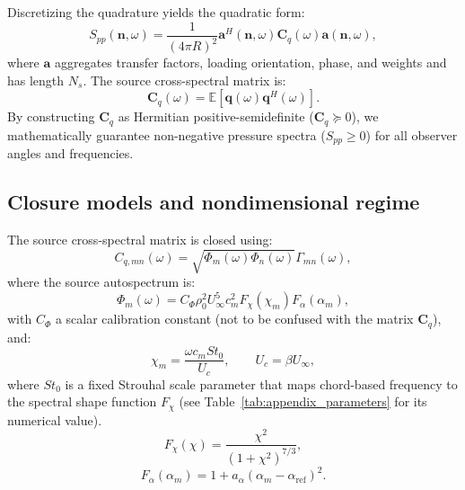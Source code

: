 \documentclass[11pt]{article}
\newcommand{\vect}[1]{\bm{#1}}
\newcommand{\mat}[1]{\bm{#1}}
\newcommand{\E}{\mathbb{E}}
\begin{document}
Discretizing the quadrature yields the quadratic form:
\begin{equation}
    S_{pp}(\vect{n},\omega)
    =
    \frac{1}{(4\pi R)^2}
    \vect{a}^{H}(\vect{n},\omega)
    \mat{C}_q(\omega)
    \vect{a}(\vect{n},\omega),
\label{eq:discrete_psd}
\end{equation}
where $\vect{a}$ aggregates transfer factors, loading orientation, phase, and weights and has length $N_s$. The source cross-spectral matrix is:
\begin{equation}
    \mat{C}_q(\omega)
    =
    \E\left[
        \vect{q}(\omega)\vect{q}^H(\omega)
    \right].
\end{equation}
By constructing $\mat{C}_q$ as Hermitian positive-semidefinite ($\mat{C}_q \succeq 0$), we mathematically guarantee non-negative pressure spectra ($S_{pp} \geq 0$) for all observer angles and frequencies.

\subsection{Closure models and nondimensional regime}

The source cross-spectral matrix is closed using:
\begin{equation}
    C_{q,mn}(\omega)
    =
    \sqrt{\Phi_m(\omega)\Phi_n(\omega)}
    \Gamma_{mn}(\omega),
\label{eq:source_cross_spectrum}
\end{equation}
where the source autospectrum is:
\begin{equation}
    \Phi_m(\omega)
    =
    C_\Phi\rho_0^2U_\infty^5c_m^2
    F_\chi(\chi_m)
    F_\alpha(\alpha_m),
\label{eq:source_autospectrum}
\end{equation}
with $C_\Phi$ a scalar calibration constant (not to be confused with the matrix $\mat{C}_q$), and:
\begin{equation}
    \chi_m=\frac{\omega c_m \mathit{St}_0}{U_c},
    \qquad
    U_c=\beta U_\infty,
\end{equation}
where $\mathit{St}_0$ is a fixed Strouhal scale parameter that maps chord-based frequency to the spectral shape function $F_\chi$ (see Table~\ref{tab:appendix_parameters} for its numerical value).
\begin{equation}
    F_\chi(\chi)=
    \frac{\chi^2}{(1+\chi^2)^{7/3}},
\end{equation}
\begin{equation}
    F_\alpha(\alpha_m)
    =
    1+a_\alpha(\alpha_m-\alpha_{\mathrm{ref}})^2.
\end{equation}
\end{document}

